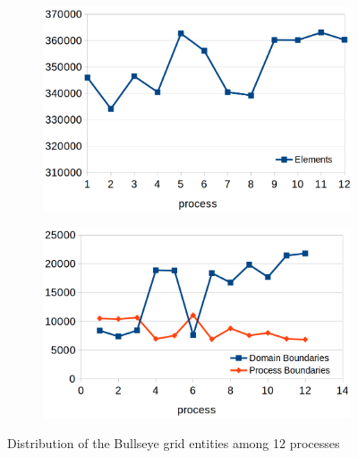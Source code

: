 \begin{figure}
\centering
	\begin{subfigure}[b]{0.48\textwidth} \includegraphics[scale=0.22]{images/elemdistr} \end{subfigure}
	\begin{subfigure}[b]{0.48\textwidth} \includegraphics[scale=0.24]{images/boundarydistr} \end{subfigure}
\caption{Distribution of the Bullseye grid entities among 12 processes}
\label{fig:impl:storage:bullseyeelemdistr}
\end{figure}


